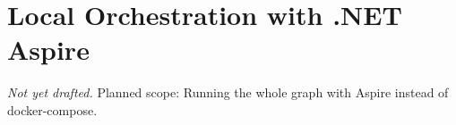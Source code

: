 \chapter{Local Orchestration with .NET Aspire}
\label{app:aspire}

\emph{Not yet drafted.} Planned scope: Running the whole graph with Aspire instead of docker-compose.
